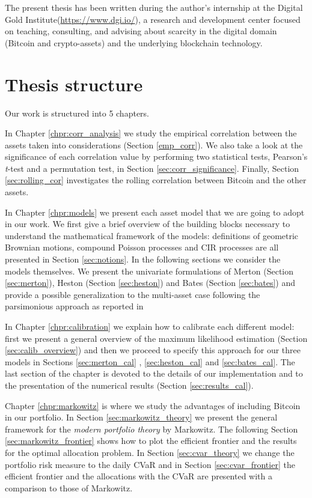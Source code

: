 \bigskip
\noindent
The present thesis has been written during the author's internship at the Digital Gold Institute(\href{https://www.dgi.io/}{https://www.dgi.io/}), a research and development center focused on teaching, consulting, and advising about scarcity in the digital domain (Bitcoin and crypto-assets) and the underlying blockchain technology.

\bigskip

\section{Thesis structure}
Our work is structured into 5 chapters.

\bigskip
\noindent
In Chapter \ref{chpr:corr_analysis} we study the empirical correlation between the assets taken into considerations (Section \ref{emp_corr}). We also take a look at the significance of each correlation value by performing two statistical tests, Pearson's \textit{t}-test and a permutation test, in Section \ref{sec:corr_significance}. Finally, Section \ref{sec:rolling_cor} investigates the rolling correlation between Bitcoin and the other assets.

\bigskip
\noindent
In Chapter \ref{chpr:models} we present each asset model that we are going to adopt in our work. We first give a brief overview of the building blocks necessary to understand the mathematical framework of the models: definitions of geometric Brownian motions, compound Poisson processes and CIR processes are all presented in Section \ref{sec:notions}. 
In the following sections we consider the models themselves. We  present the univariate formulations of Merton (Section \ref{sec:merton}), Heston (Section \ref{sec:heston}) and Bates (Section \ref{sec:bates}) and provide a possible generalization to the multi-asset case following the parsimonious approach as reported in \citep{PARSIMONIOUS2011}

\bigskip
\noindent
In Chapter \ref{chpr:calibration} we explain how to calibrate each different model: first we present a general overview of the maximum likelihood estimation (Section \ref{sec:calib_overview}) and then we proceed to specify this approach for our three models in Sections \ref{sec:merton_cal} , \ref{sec:heston_cal} and \ref{sec:bates_cal}. 
The last section of the chapter is devoted to the details of our implementation and to the presentation of the numerical results (Section \ref{sec:results_cal}).

\bigskip
\noindent
Chapter \ref{chpr:markowitz} is where we study the advantages of including Bitcoin in our portfolio. In Section \ref{sec:markowitz_theory} we present the general framework for the \textit{modern portfolio theory} by Markowitz. The following Section \ref{sec:markowitz_frontier} shows how to plot the efficient frontier and the results for the optimal allocation problem.
In Section \ref{sec:cvar_theory} we change the portfolio risk measure to the daily CVaR and in Section \ref{sec:cvar_frontier} the efficient frontier and the allocations with the CVaR are presented with a comparison to those of Markowitz.

